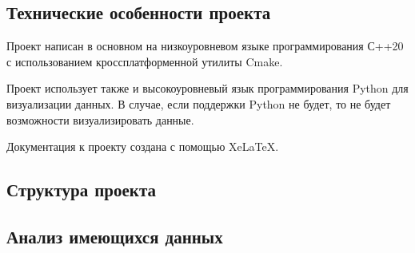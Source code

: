 \subsection{ \standartTitleFont
  Технические особенности проекта
}

{\standartFont

  \par Проект написан в основном на низкоуровневом языке программирования С++20 с использованием кроссплатформенной утилиты Cmake. 

  \par Проект использует также и высокоуровневый язык программирования Python для визуализации данных. В случае, если поддержки Python не будет, то не будет возможности визуализировать данные. 

  \par Документация к проекту создана с помощью XeLaTeX. 

  \par 
}

\subsection{ \standartTitleFont
  Структура проекта 
}

{\standartFont

  \par  

  \par 
}


\subsection{ \standartTitleFont
  Анализ имеющихся данных 
}


